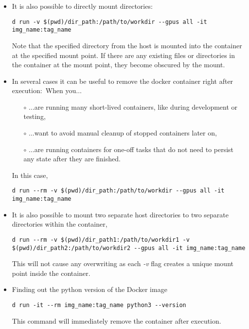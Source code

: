 \documentclass[12pt, a4paper]{scrbook}
\numberwithin{equation}{section}
\theoremstyle{definition}
\theoremstyle{definition}
\begin{document}
\begin{itemize}
		\item It is also possible to directly mount directories:
		
		\begin{lstlisting}[style=mystylebash, label=alg:docker_run__mount_dir, xleftmargin=\parindent]
			d run -v $(pwd)/dir_path:/path/to/workdir --gpus all -it img_name:tag_name
		\end{lstlisting}
		
		Note that the specified directory from the host is mounted into the container at the specified mount point. If there are any existing files or directories in the container at the mount point, they become obscured by the mount.
		
		\item In several cases it can be useful to remove the docker container right after execution:~When you$\dots$
		\begin{itemize}
			\item[$\circ$] $\dots$are running many short-lived containers, like during development or testing,
			\item[$\circ$] $\dots$want to avoid manual cleanup of stopped containers later on,
			\item[$\circ$] $\dots$are running containers for one-off tasks that do not need to persist any state after they are finished.
		\end{itemize}
		
		In this case, 
		
		\begin{lstlisting}[style=mystylebash, label=alg:docker_run__mount_dir_rm, xleftmargin=\parindent]
			d run --rm -v $(pwd)/dir_path:/path/to/workdir --gpus all -it img_name:tag_name
		\end{lstlisting}
		
		\item It is also possible to mount two separate host directories to two separate directories within the container,
		
		\begin{lstlisting}[style=mystylebash, label=alg:docker_run__mount_sev_dir_rm, xleftmargin=\parindent]
			d run --rm -v $(pwd)/dir_path1:/path/to/workdir1 -v $(pwd)/dir_path2:/path/to/workdir2 --gpus all -it img_name:tag_name
		\end{lstlisting}
		
		This will not cause any overwriting as each \textit{-v} flag creates a unique mount point inside the container. 
		
		\item Finding out the python version of the Docker image
		
		\begin{lstlisting}[style=mystylebash, label=alg:docker__python_version, xleftmargin=\parindent]
			d run -it --rm img_name:tag_name python3 --version
		\end{lstlisting}
		
		This command will immediately remove the container after execution.
		
	\end{itemize}
	
\end{document}
